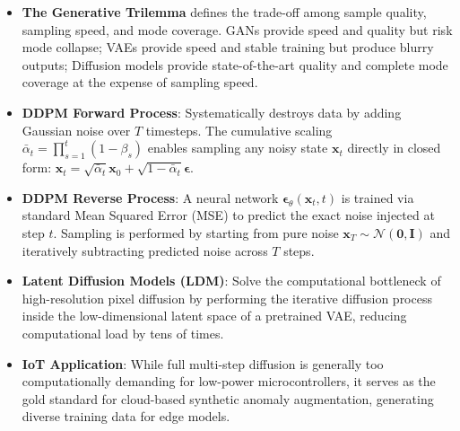 \begin{takeaways}
\begin{itemize}
    \item \textbf{The Generative Trilemma} defines the trade-off among sample quality, sampling speed, and mode coverage. GANs provide speed and quality but risk mode collapse; VAEs provide speed and stable training but produce blurry outputs; Diffusion models provide state-of-the-art quality and complete mode coverage at the expense of sampling speed.
    \item \textbf{DDPM Forward Process}: Systematically destroys data by adding Gaussian noise over $T$ timesteps. The cumulative scaling $\bar{\alpha}_t = \prod_{s=1}^t (1 - \beta_s)$ enables sampling any noisy state $\mathbf{x}_t$ directly in closed form: $\mathbf{x}_t = \sqrt{\bar{\alpha}_t}\mathbf{x}_0 + \sqrt{1 - \bar{\alpha}_t}\boldsymbol{\epsilon}$.
    \item \textbf{DDPM Reverse Process}: A neural network $\boldsymbol{\epsilon}_\theta(\mathbf{x}_t, t)$ is trained via standard Mean Squared Error (MSE) to predict the exact noise injected at step $t$. Sampling is performed by starting from pure noise $\mathbf{x}_T \sim \mathcal{N}(\mathbf{0}, \mathbf{I})$ and iteratively subtracting predicted noise across $T$ steps.
    \item \textbf{Latent Diffusion Models (LDM)}: Solve the computational bottleneck of high-resolution pixel diffusion by performing the iterative diffusion process inside the low-dimensional latent space of a pretrained VAE, reducing computational load by tens of times.
    \item \textbf{IoT Application}: While full multi-step diffusion is generally too computationally demanding for low-power microcontrollers, it serves as the gold standard for cloud-based synthetic anomaly augmentation, generating diverse training data for edge models.
\end{itemize}
\end{takeaways}


